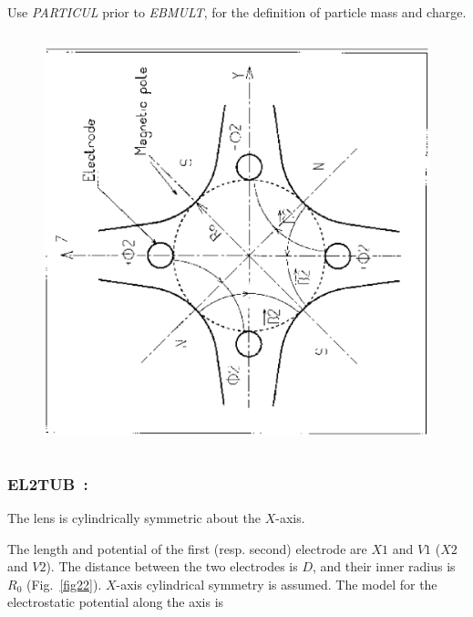 \noindent Use \textsl{PARTICUL} prior to \textsl{EBMULT}, for the 
 definition of  particle mass and charge.
\vfill

\begin{figure}[H]
\centerline{\includegraphics[height=12cm,angle=-90]{Fig20.ps}}
\end{figure}

\newpage

\subsubsection*{EL2TUB~: \ELTwoTUBTitl} \label{EL2TUB} 
\medskip

The lens is cylindrically symmetric about the $ X $-axis. 

\noindent The length and potential of the first (resp. second) electrode 
are $ X1 $ and $ V1 $ ($ X2 $ and $ V2$).   The distance between the two 
electrodes is $ D$,   and their inner radius is $ R_0 $ (Fig.~\ref{fig22}).   
$X$-axis  cylindrical symmetry is assumed. The model for the electrostatic potential 
along the axis is~\cite{Biblio16}     %

